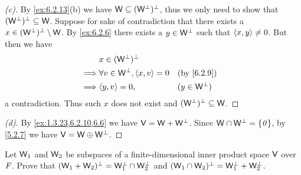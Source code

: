 \begin{proof}[(c)]
  By \cref{ex:6.2.13}(b) we have \(\mathsf{W} \subseteq (\mathsf{W}^{\perp})^{\perp}\), thus we only need to show that \((\mathsf{W}^{\perp})^{\perp} \subseteq \mathsf{W}\).
  Suppose for sake of contradiction that there exists a \(x \in (\mathsf{W}^{\perp})^{\perp} \setminus \mathsf{W}\).
  By \cref{ex:6.2.6} there exists a \(y \in \mathsf{W}^{\perp}\) such that \(\left\langle x, y\right\rangle \neq 0\).
  But then we have
  \begin{align*}
             & x \in (\W^{\perp})^{\perp}                                             \\
    \implies & \forall v \in \W^{\perp}, \inn{x, v} = 0 &  & \text{(by \cref{6.2.9})} \\
    \implies & \inn{y, v} = 0,                          &  & (y \in \W^{\perp})
  \end{align*}
  a contradiction.
  Thus such \(x\) does not exist and \((\mathsf{W}^{\perp})^{\perp} \subseteq \mathsf{W}\).
\end{proof}

\begin{proof}[(d)]
  By \cref{ex:1.3.23,6.2.10,6.6} we have \(\mathsf{V} = \mathsf{W} + \mathsf{W}^{\perp}\).
  Since \(\mathsf{W} \cap \mathsf{W}^{\perp} = \left\lbrace\mathit{0}\right\rbrace\), by \cref{5.2.7} we have \(\mathsf{V} = \mathsf{W} \oplus \mathsf{W}^{\perp}\).
\end{proof}

\begin{ex}\label{ex:6.2.14}
  Let \(\mathsf{W}_1\) and \(\mathsf{W}_2\) be subspaces of a finite-dimensional inner product space \(\mathsf{V}\) over \(\mathit{F}\).
  Prove that \((\mathsf{W}_1 + \mathsf{W}_2)^{\perp} = \mathsf{W}_1^{\perp} \cap \mathsf{W}_2^{\perp}\) and \((\mathsf{W}_1 \cap \mathsf{W}_2)^{\perp} = \mathsf{W}_1^{\perp} + \mathsf{W}_2^{\perp}\).
\end{ex}

